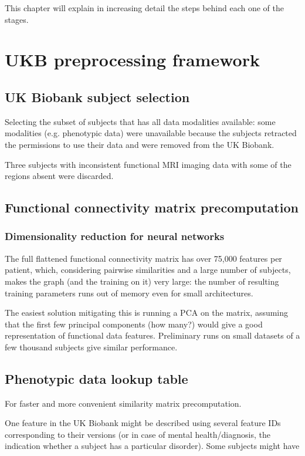This chapter will explain in increasing detail the steps behind each one of the stages.

\section{UKB preprocessing framework}
\subsection{UK Biobank subject selection}
Selecting the subset of subjects that has all data modalities available: some modalities (e.g. phenotypic data) were unavailable because the subjects retracted the permissions to use their data and were removed from the UK Biobank.

Three subjects with inconsistent functional MRI imaging data with some of the regions absent were discarded.


\subsection{Functional connectivity matrix precomputation}

\subsubsection{Dimensionality reduction for neural networks}
The full flattened functional connectivity matrix has over 75,000 features per patient, which, considering pairwise similarities and a large number of subjects, makes the graph (and the training on it) very large: the number of resulting training parameters runs out of memory even for small architectures.

The easiest solution mitigating this is running a PCA on the matrix, assuming that the first few principal components (how many?) would give a good representation of functional data features. Preliminary runs on small datasets of a few thousand subjects give similar performance.

\subsection{Phenotypic data lookup table}
For faster and more convenient similarity matrix precomputation.

One feature in the UK Biobank might be described using several feature IDs corresponding to their versions (or in case of mental health/diagnosis, the indication whether a subject has a particular disorder). Some subjects might have 

